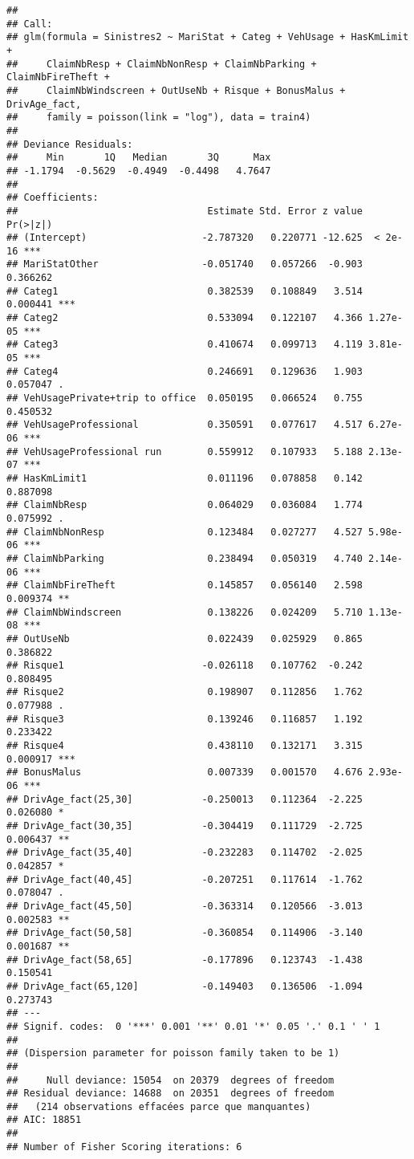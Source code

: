 \documentclass[
]{article}
\begin{document}
\begin{verbatim}
## 
## Call:
## glm(formula = Sinistres2 ~ MariStat + Categ + VehUsage + HasKmLimit + 
##     ClaimNbResp + ClaimNbNonResp + ClaimNbParking + ClaimNbFireTheft + 
##     ClaimNbWindscreen + OutUseNb + Risque + BonusMalus + DrivAge_fact, 
##     family = poisson(link = "log"), data = train4)
## 
## Deviance Residuals: 
##     Min       1Q   Median       3Q      Max  
## -1.1794  -0.5629  -0.4949  -0.4498   4.7647  
## 
## Coefficients:
##                                 Estimate Std. Error z value Pr(>|z|)    
## (Intercept)                    -2.787320   0.220771 -12.625  < 2e-16 ***
## MariStatOther                  -0.051740   0.057266  -0.903 0.366262    
## Categ1                          0.382539   0.108849   3.514 0.000441 ***
## Categ2                          0.533094   0.122107   4.366 1.27e-05 ***
## Categ3                          0.410674   0.099713   4.119 3.81e-05 ***
## Categ4                          0.246691   0.129636   1.903 0.057047 .  
## VehUsagePrivate+trip to office  0.050195   0.066524   0.755 0.450532    
## VehUsageProfessional            0.350591   0.077617   4.517 6.27e-06 ***
## VehUsageProfessional run        0.559912   0.107933   5.188 2.13e-07 ***
## HasKmLimit1                     0.011196   0.078858   0.142 0.887098    
## ClaimNbResp                     0.064029   0.036084   1.774 0.075992 .  
## ClaimNbNonResp                  0.123484   0.027277   4.527 5.98e-06 ***
## ClaimNbParking                  0.238494   0.050319   4.740 2.14e-06 ***
## ClaimNbFireTheft                0.145857   0.056140   2.598 0.009374 ** 
## ClaimNbWindscreen               0.138226   0.024209   5.710 1.13e-08 ***
## OutUseNb                        0.022439   0.025929   0.865 0.386822    
## Risque1                        -0.026118   0.107762  -0.242 0.808495    
## Risque2                         0.198907   0.112856   1.762 0.077988 .  
## Risque3                         0.139246   0.116857   1.192 0.233422    
## Risque4                         0.438110   0.132171   3.315 0.000917 ***
## BonusMalus                      0.007339   0.001570   4.676 2.93e-06 ***
## DrivAge_fact(25,30]            -0.250013   0.112364  -2.225 0.026080 *  
## DrivAge_fact(30,35]            -0.304419   0.111729  -2.725 0.006437 ** 
## DrivAge_fact(35,40]            -0.232283   0.114702  -2.025 0.042857 *  
## DrivAge_fact(40,45]            -0.207251   0.117614  -1.762 0.078047 .  
## DrivAge_fact(45,50]            -0.363314   0.120566  -3.013 0.002583 ** 
## DrivAge_fact(50,58]            -0.360854   0.114906  -3.140 0.001687 ** 
## DrivAge_fact(58,65]            -0.177896   0.123743  -1.438 0.150541    
## DrivAge_fact(65,120]           -0.149403   0.136506  -1.094 0.273743    
## ---
## Signif. codes:  0 '***' 0.001 '**' 0.01 '*' 0.05 '.' 0.1 ' ' 1
## 
## (Dispersion parameter for poisson family taken to be 1)
## 
##     Null deviance: 15054  on 20379  degrees of freedom
## Residual deviance: 14688  on 20351  degrees of freedom
##   (214 observations effacées parce que manquantes)
## AIC: 18851
## 
## Number of Fisher Scoring iterations: 6
\end{verbatim}
\end{document}

